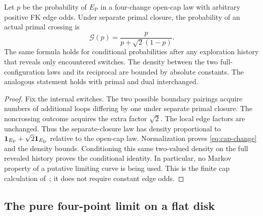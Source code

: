\begin{lemma}\label{lem:cap-change}
Let $p$ be the probability of $E_{\mathrm P}$ in a four-change open-cap
law with arbitrary positive FK edge odds. Under separate primal closure,
the probability of an actual primal crossing is
\begin{equation}\label{eq:cap-change}
 \mathcal G(p)=\frac{p}{p+\sqrt2(1-p)}.
\end{equation}
The same formula holds for conditional probabilities after any exploration
history that reveals only encountered switches. The density between the
two full-configuration laws and its reciprocal are bounded by absolute
constants. The analogous statement holds with primal and dual interchanged.
\end{lemma}

\begin{proof}
Fix the internal switches. The two possible boundary pairings acquire
numbers of additional loops differing by one under separate primal
closure. The noncrossing outcome acquires the extra factor $\sqrt2$.
The local edge factors are unchanged. Thus the separate-closure law has
density proportional to
$\mathbf 1_{E_{\mathrm P}}+\sqrt2\mathbf 1_{E_{\mathrm D}}$
relative to the open-cap law. Normalization proves
\eqref{eq:cap-change} and the density bounds. Conditioning this same
two-valued density on the full revealed history proves the conditional
identity. In particular, no Markov property of a putative limiting curve
is being used. This is the finite cap calculation of~\cite[Section
``Alternating tests after exploration'']{C}; it does not require constant
edge odds.
\end{proof}

\subsection{The pure four-point limit on a flat disk}

